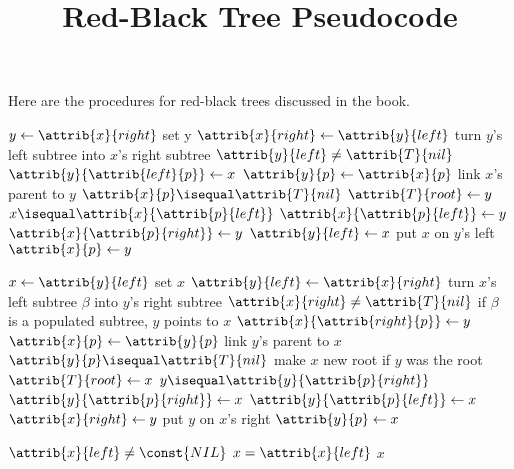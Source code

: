 \documentclass{article}
\title{Red-Black Tree Pseudocode}
\author{}
\date{}
\begin{document}
\maketitle

Here are the procedures for red-black trees discussed in the book.

\begin{codebox}
\li $y \gets{\attrib{x}{right}}$ \Comment set y
\li $\attrib{x}{right} \gets{\attrib{y}{left}}$ \Comment turn $y$'s left subtree into $x$'s right subtree
\li \If $\attrib{y}{left} \neq \attrib{T}{nil}$
\li \Then
        $\attrib{y}{\attrib{left}{p}} \gets{x}$
    \End
\li $\attrib{y}{p} \gets{\attrib{x}{p}}$ \Comment link $x$'s parent to $y$
\li \If $\attrib{x}{p} \isequal \attrib{T}{nil}$
\li \Then
        $\attrib{T}{root} \gets{y}$
\li \ElseIf $x \isequal \attrib{x}{\attrib{p}{left}}$
\li \Then
        $\attrib{x}{\attrib{p}{left}} \gets{y}$
\li \Else
\li     $\attrib{x}{\attrib{p}{right}} \gets{y}$
    \End
\li $\attrib{y}{left} \gets{x}$ \Comment put $x$ on $y$'s left
\li $\attrib{x}{p} \gets{y}$
\end{codebox}

\begin{codebox}
\li $x \gets{\attrib{y}{left}}$ \Comment set $x$
\li $\attrib{y}{left} \gets{\attrib{x}{right}}$ \Comment turn $x$'s left subtree $\beta$ into $y$'s right subtree
\li \If $\attrib{x}{right} \neq \attrib{T}{nil}$ \Comment if $\beta$ is a populated subtree, $y$ points to $x$
\li \Then
        $\attrib{x}{\attrib{right}{p}} \gets{y}$
    \End
\li $\attrib{x}{p} \gets{\attrib{y}{p}}$ \Comment link $y$'s parent to $x$
\li \If $\attrib{y}{p} \isequal \attrib{T}{nil}$ \Comment make $x$ new root if $y$ was the root
\li \Then
        $\attrib{T}{root} \gets{x}$
\li \ElseIf $y \isequal \attrib{y}{\attrib{p}{right}}$
\li \Then
        $\attrib{y}{\attrib{p}{right}} \gets{x}$
\li \Else
\li     $\attrib{y}{\attrib{p}{left}} \gets{x}$
    \End
\li $\attrib{x}{right} \gets{y}$ \Comment put $y$ on $x$'s right
\li $\attrib{y}{p} \gets{x}$
\end{codebox}

\begin{codebox}
\li \While $\attrib{x}{left} \neq \const{NIL}$
    \Do
    \li     $x = \attrib{x}{left}$
    \End
\li \Return $x$
\end{codebox}
\end{document}
